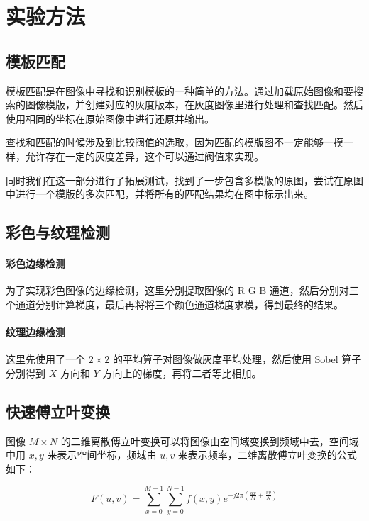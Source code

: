 \documentclass[11pt]{ctexart}
\begin{document}
\section{实验方法}

\subsection{模板匹配}

模板匹配是在图像中寻找和识别模板的一种简单的方法。通过加载原始图像和要搜索的图像模版，并创建对应的灰度版本，在灰度图像里进行处理和查找匹配。然后使用相同的坐标在原始图像中进行还原并输出。

查找和匹配的时候涉及到比较阀值的选取，因为匹配的模版图不一定能够一摸一样，允许存在一定的灰度差异，这个可以通过阀值来实现。

同时我们在这一部分进行了拓展测试，找到了一步包含多模版的原图，尝试在原图中进行一个模版的多次匹配，并将所有的匹配结果均在图中标示出来。

\subsection{彩色与纹理检测}


\paragraph{彩色边缘检测}

为了实现彩色图像的边缘检测，这里分别提取图像的 R G B 通道，然后分别对三个通道分别计算梯度，最后再将将三个颜色通道梯度求模，得到最终的结果。

\paragraph{纹理边缘检测}

这里先使用了一个 $2\times 2$ 的平均算子对图像做灰度平均处理，然后使用 Sobel 算子分别得到 $X$ 方向和 $Y$ 方向上的梯度，再将二者等比相加。

\subsection{快速傅立叶变换}

图像 $M\times N$ 的二维离散傅立叶变换可以将图像由空间域变换到频域中去，空间域中用 $x,y$ 来表示空间坐标，频域由 $u,v$ 来表示频率，二维离散傅立叶变换的公式如下：

$$F(u,v)=\sum _{x=0}^{M-1} \sum_{y=0}^{N-1}f(x,y) e^{-j2\pi (\frac{ux}{M}+\frac{vy}{N})}$$
\end{document}
